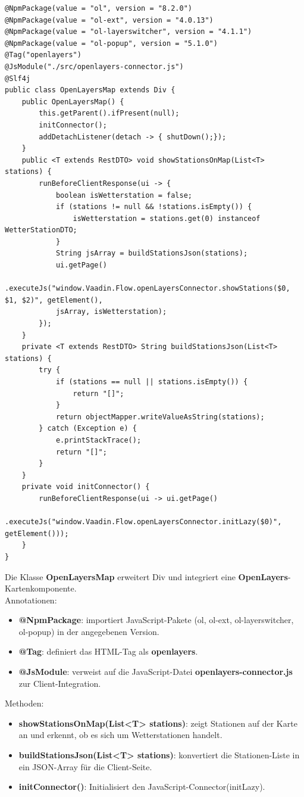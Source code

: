 \documentclass[a4paper,12pt]{scrreprt}
\begin{document}
\begin{lstlisting}
@NpmPackage(value = "ol", version = "8.2.0")
@NpmPackage(value = "ol-ext", version = "4.0.13")
@NpmPackage(value = "ol-layerswitcher", version = "4.1.1")
@NpmPackage(value = "ol-popup", version = "5.1.0")
@Tag("openlayers")
@JsModule("./src/openlayers-connector.js")
@Slf4j
public class OpenLayersMap extends Div {
	public OpenLayersMap() {
		this.getParent().ifPresent(null);
		initConnector();
		addDetachListener(detach -> { shutDown();});
	}
	public <T extends RestDTO> void showStationsOnMap(List<T> stations) {
		runBeforeClientResponse(ui -> {
			boolean isWetterstation = false;
			if (stations != null && !stations.isEmpty()) {
				isWetterstation = stations.get(0) instanceof WetterStationDTO;
			}
			String jsArray = buildStationsJson(stations);
			ui.getPage()
			.executeJs("window.Vaadin.Flow.openLayersConnector.showStations($0, $1, $2)", getElement(),
			jsArray, isWetterstation);
		});
	}
	private <T extends RestDTO> String buildStationsJson(List<T> stations) {
		try {
			if (stations == null || stations.isEmpty()) {
				return "[]";
			}
			return objectMapper.writeValueAsString(stations);
		} catch (Exception e) {
			e.printStackTrace();
			return "[]";
		}
	}
	private void initConnector() {
		runBeforeClientResponse(ui -> ui.getPage()
		.executeJs("window.Vaadin.Flow.openLayersConnector.initLazy($0)", getElement()));
	}
}
\end{lstlisting}

Die Klasse \textbf{OpenLayersMap} erweitert Div und integriert eine  \textbf{OpenLayers}-Kartenkomponente.\\
Annotationen:
\begin{itemize}
\item \textbf{@NpmPackage}: importiert JavaScript-Pakete (ol, ol-ext, ol-layerswitcher, ol-popup) in der angegebenen Version.
\item \textbf{@Tag}: definiert das HTML-Tag als \textbf{openlayers}.
\item \textbf{@JsModule}: verweist auf die JavaScript-Datei \textbf{openlayers-connector.js} zur Client-Integration.
\end{itemize}
Methoden:
\begin{itemize}
	\item \textbf{showStationsOnMap(List<T> stations)}: zeigt Stationen auf der Karte an und erkennt, ob es sich um Wetterstationen handelt.
	\item \textbf{buildStationsJson(List<T> stations)}: konvertiert die Stationen-Liste in ein JSON-Array für die Client-Seite.
	\item \textbf{initConnector()}: Initialisiert den JavaScript-Connector(initLazy).
\end{itemize}
\end{document}
